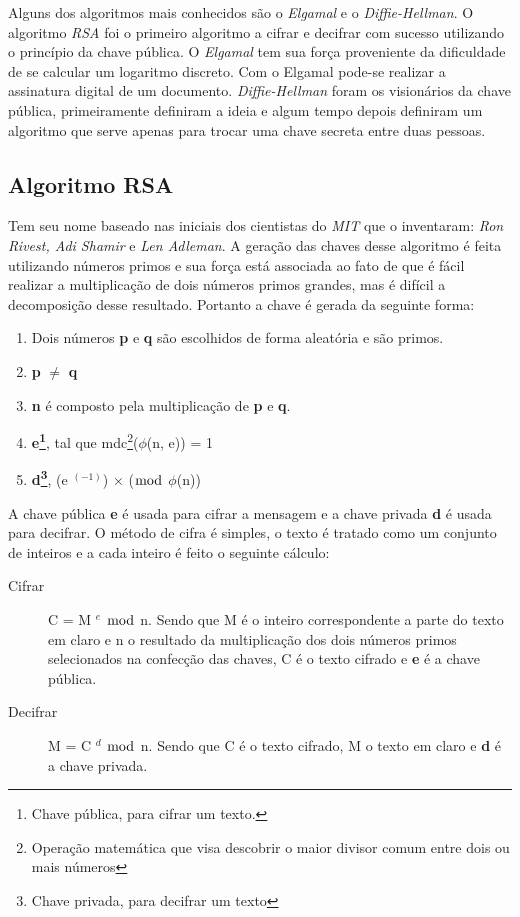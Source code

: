 %
Alguns dos algoritmos mais conhecidos são o \textit{Elgamal} e o \textit{Diffie-Hellman}. O algoritmo \textit{RSA} foi o primeiro algoritmo a cifrar e decifrar com sucesso utilizando o princípio da chave pública. O \textit{Elgamal} tem sua força proveniente da dificuldade de se calcular um logaritmo discreto. Com o Elgamal pode-se realizar a assinatura digital de um documento. \textit{Diffie-Hellman} foram os visionários da chave pública, primeiramente definiram a ideia e algum tempo depois definiram um algoritmo que serve apenas para trocar uma chave secreta entre duas pessoas. 

\subsection{Algoritmo RSA}
\label{algorithm-rsa}

Tem seu nome baseado nas iniciais dos cientistas do \textit{MIT} que o inventaram: \textit{Ron Rivest, Adi Shamir} e \textit{Len Adleman}. A geração das chaves desse algoritmo é feita utilizando números primos e sua força está associada ao fato de que é fácil realizar a multiplicação de dois números primos grandes, mas é difícil a decomposição desse resultado. Portanto a chave é gerada da seguinte forma:

\begin{enumerate}
\item Dois números \textbf{p} e \textbf{q} são escolhidos de forma aleatória e são primos.
\item \textbf{p} $\neq$ \textbf{q}
\item \textbf{n} é composto pela multiplicação de \textbf{p} e \textbf{q}.
\item \textbf{e\footnote{Chave pública, para cifrar um texto.}}, tal que mdc\footnote{Operação matemática que visa descobrir o maior divisor comum entre dois ou mais números}($\phi$(n, e)) = 1
\item \textbf{d\footnote{Chave privada, para decifrar um texto }}, (e $^ {(-1)}$) $\times$ ($\bmod$ $\phi$(n)) 
\end{enumerate}

%
A chave pública \textbf{e}  é usada para cifrar a mensagem e a chave privada \textbf{d} é usada para decifrar. O método de cifra é simples, o texto é tratado como um conjunto de inteiros e a cada inteiro é feito o seguinte cálculo:

\begin{description}
\item [Cifrar]
C = M $^ e$ $\bmod$ n. Sendo que M é o inteiro correspondente a parte do texto em claro e n o resultado da multiplicação dos dois números primos selecionados na confecção  das chaves, C é o texto cifrado e \textbf{e} é a chave pública. 
\item [Decifrar]
M = C $^ d$ $\bmod$ n. Sendo que C é o texto cifrado, M o texto em claro e \textbf{d} é a chave privada.
\end{description}

